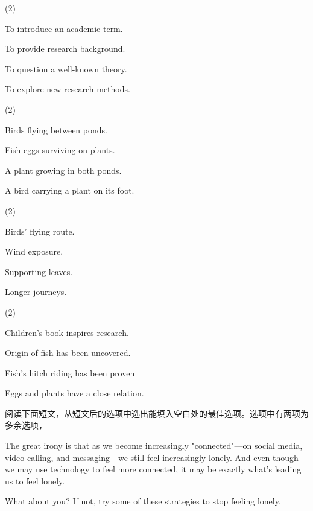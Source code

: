 \documentclass{英语试卷}
\begin{document}
\begin{choices}(2)
  \item To introduce an academic term.
  \item To provide research background.
  \item To question a well-known theory.
  \item To explore new research methods.
\end{choices}
\begin{choices}(2)
  \item Birds flying between ponds.
  \item Fish eggs surviving on plants.
  \item A plant growing in both ponds.
  \item A bird carrying a plant on its foot.
\end{choices}
\begin{choices}(2)
  \item Birds' flying route.
  \item Wind exposure.
  \item Supporting leaves.
  \item Longer journeys.
\end{choices}
\begin{choices}(2)
  \item Children's book inspires research.
  \item Origin of fish has been uncovered.
  \item Fish's hitch riding has been proven
  \item Eggs and plants have a close relation.
\end{choices}
\par 阅读下面短文，从短文后的选项中选出能填入空白处的最佳选项。选项中有两项为多余选项，\par
\par The great irony is that as we become increasingly "connected"—on social media, video calling, and messaging—we still feel increasingly lonely. And even though we may use technology to feel more connected, it may be exactly what's leading us to feel lonely.\par
\par What about you?  If not, try some of these strategies to stop feeling lonely.\par
\end{document}
